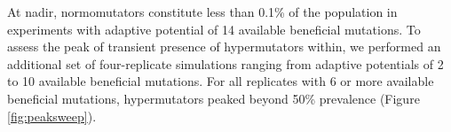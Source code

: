 

At nadir, normomutators constitute less than 0.1\% of the population in experiments with adaptive potential of 14 available beneficial mutations.
To assess the peak of transient presence of hypermutators within, we performed an additional set of four-replicate simulations ranging from adaptive potentials of 2 to 10 available beneficial mutations.
For all replicates with 6 or more available beneficial mutations, hypermutators peaked beyond 50\% prevalence (Figure \ref{fig:peaksweep}).
